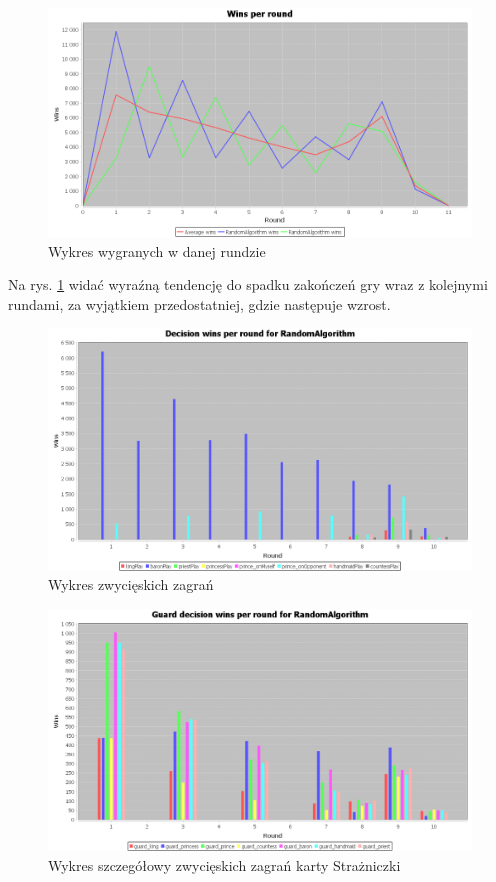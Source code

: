 \begin{figure}[H]
	\centering
	\includegraphics[width=\textwidth]{Resources/RVsR/RVsRroundwin.PNG}
	\caption{Wykres wygranych w danej rundzie} 
	\label{fig:RVsRroundwin}
\end{figure}

Na rys. \ref{fig:RVsRroundwin} widać wyraźną tendencję do spadku zakończeń gry wraz z kolejnymi rundami, za wyjątkiem przedostatniej, gdzie następuje wzrost.

\clearpage
\begin{figure}[H]
	\centering
	\includegraphics[width=\textwidth]{Resources/RVsR/RVsRdecision.PNG}
	\caption{Wykres zwycięskich zagrań} 
	\label{fig:RVsRdecision}
\end{figure} 

\begin{figure}[H]
	\centering
	\includegraphics[width=\textwidth]{Resources/RVsR/RVsRguarddecision.PNG}
	\caption{Wykres szczegółowy zwycięskich zagrań karty Strażniczki} 
	\label{fig:RVsRguarddecision}
\end{figure}

